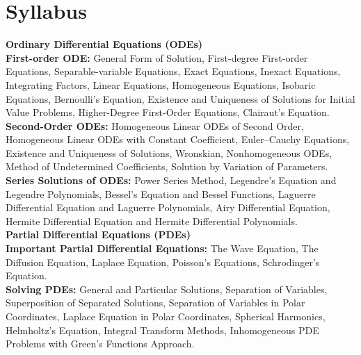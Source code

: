 \documentclass[a4aper,12pt]{report}
\begin{document}
    \chapter*{Syllabus}
    \vspace*{-2.7cm}
    \textbf{Ordinary Differential Equations (ODEs)} \\ [5pt] 
    \textbf{First-order ODE: }General Form of Solution, First-degree First-order Equations, Separable-variable Equations, Exact Equations, Inexact Equations, Integrating Factors, Linear Equations, Homogeneous Equations, Isobaric Equations, Bernoulli’s Equation, Existence and Uniqueness of Solutions for Initial Value Problems, Higher-Degree First-Order Equations, Clairaut’s Equation. \\ [5pt]
    \textbf{Second-Order ODEs: }Homogeneous Linear ODEs of Second Order, Homogeneous Linear ODEs with Constant Coefficient, Euler–Cauchy Equations, Existence and Uniqueness of Solutions, Wronskian, Nonhomogeneous ODEs, Method of Undetermined Coefficients, Solution by Variation of Parameters. \\ [5pt]
    \textbf{Series Solutions of ODEs: }Power Series Method, Legendre’s Equation and Legendre Polynomials, Bessel’s Equation and Bessel Functions, Laguerre Differential Equation and Laguerre Polynomials, Airy Differential Equation, Hermite Differential Equation and Hermite Differential Polynomials. \\ [8pt]\textbf{Partial Differential Equations (PDEs)} \\ [5pt] 
    \textbf{Important Partial Differential Equations: }The Wave Equation, The Diffusion Equation, Laplace Equation, Poisson’s Equations, Schrodinger’s Equation. \\ [5pt]
    \textbf{Solving PDEs: }General and Particular Solutions, Separation of Variables, Superposition of Separated Solutions, Separation of Variables in Polar Coordinates, Laplace Equation in Polar Coordinates, Spherical Harmonics, Helmholtz’s Equation, Integral Transform Methods, Inhomogeneous PDE Problems with Green’s Functions Approach.
\newpage
\end{document}
